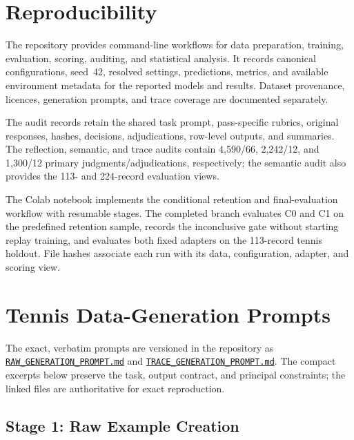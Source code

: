 \documentclass[conference]{IEEEtran}
\begin{document}
\newpage
\section{Reproducibility}

The repository provides command-line workflows for data preparation, training, evaluation, scoring, auditing, and statistical analysis. It records canonical configurations, seed~42, resolved settings, predictions, metrics, and available environment metadata for the reported models and results. Dataset provenance, licences, generation prompts, and trace coverage are documented separately.

The audit records retain the shared task prompt, pass-specific rubrics, original responses, hashes, decisions, adjudications, row-level outputs, and summaries. The reflection, semantic, and trace audits contain 4,590/66, 2,242/12, and 1,300/12 primary judgments/adjudications, respectively; the semantic audit also provides the 113- and 224-record evaluation views.

The Colab notebook implements the conditional retention and final-evaluation workflow with resumable stages. The completed branch evaluates C0 and C1 on the predefined retention sample, records the inconclusive gate without starting replay training, and evaluates both fixed adapters on the 113-record tennis holdout. File hashes associate each run with its data, configuration, adapter, and scoring view.

\clearpage
\onecolumn
\appendices

\section{Tennis Data-Generation Prompts}
\label{app:tennis-prompts}

The exact, verbatim prompts are versioned in the repository as
\href{https://github.com/thestbobo/tiser_temporal_reasoning_extension/blob/main/docs/extensions/tennis_domain_adaptation/RAW_GENERATION_PROMPT.md}{\texttt{RAW\_GENERATION\_PROMPT.md}} and
\href{https://github.com/thestbobo/tiser_temporal_reasoning_extension/blob/main/docs/extensions/tennis_domain_adaptation/TRACE_GENERATION_PROMPT.md}{\texttt{TRACE\_GENERATION\_PROMPT.md}}.
The compact excerpts below preserve the task, output contract, and principal constraints; the linked files are authoritative for exact reproduction.

\subsection{Stage 1: Raw Example Creation}
\end{document}
